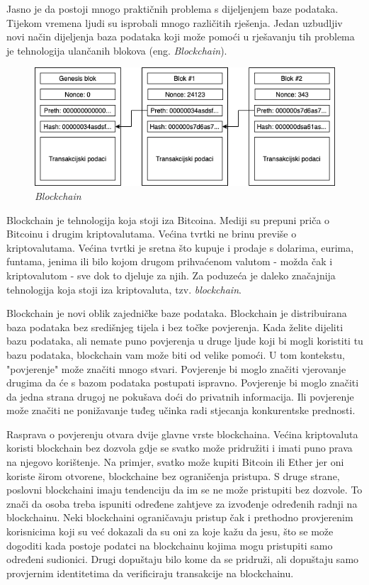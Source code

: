 \documentclass[times, utf8, diplomski]{fer}
\begin{document}
Jasno je da postoji mnogo praktičnih problema s dijeljenjem baze podataka. Tijekom vremena ljudi su isprobali mnogo različitih rješenja. Jedan uzbudljiv novi način dijeljenja baza podataka koji može pomoći u rješavanju tih problema je tehnologija ulančanih blokova (eng. \textit{Blockchain}). 

\begin{figure}[htb]
\centering
\includegraphics[width=12cm]{imgs/Blockchain.png}
\caption{\textit{Blockchain}}
\label{fig:blockchain}
\end{figure}

Blockchain je tehnologija koja stoji iza Bitcoina. Mediji su prepuni priča o Bitcoinu i drugim kriptovalutama. Većina tvrtki ne brinu previše o kriptovalutama. Većina tvrtki je sretna što kupuje i prodaje s dolarima, eurima, funtama,  jenima ili bilo kojom drugom prihvaćenom valutom - možda čak i kriptovalutom - sve dok to djeluje za njih. Za poduzeća je daleko značajnija tehnologija koja stoji iza kriptovaluta, tzv.  \textit{blockchain}.

Blockchain je novi oblik zajedničke baze podataka.  Blockchain je distribuirana baza podataka bez središnjeg tijela i bez točke povjerenja. Kada želite dijeliti bazu podataka, ali nemate puno povjerenja u druge ljude koji bi mogli koristiti tu bazu podataka, blockchain vam može biti od velike pomoći. U tom kontekstu, "povjerenje" može značiti mnogo stvari. Povjerenje bi moglo značiti vjerovanje drugima da će s bazom podataka postupati ispravno. Povjerenje bi moglo značiti da jedna strana drugoj ne pokušava doći do privatnih informacija. Ili povjerenje može značiti ne ponižavanje tuđeg učinka radi stjecanja konkurentske prednosti.

Rasprava o povjerenju otvara dvije glavne vrste blockchaina. Većina kriptovaluta koristi blockchain bez dozvola gdje se svatko može pridružiti i imati puno prava na njegovo korištenje. Na primjer, svatko može kupiti Bitcoin ili Ether jer oni koriste širom otvorene, blockchaine bez ograničenja pristupa. S druge strane, poslovni blockchaini imaju tendenciju da im se ne može pristupiti bez dozvole. To znači da osoba treba ispuniti određene zahtjeve za izvođenje određenih radnji na blockchainu. Neki blockchaini ograničavaju pristup čak i prethodno provjerenim korisnicima koji su već dokazali da su oni za koje kažu da jesu, što se može dogoditi kada postoje podatci na blockchainu kojima mogu pristupiti samo određeni sudionici. Drugi dopuštaju bilo kome da se pridruži, ali dopuštaju samo provjernim identitetima da verificiraju transakcije na blockchainu.
\end{document}
